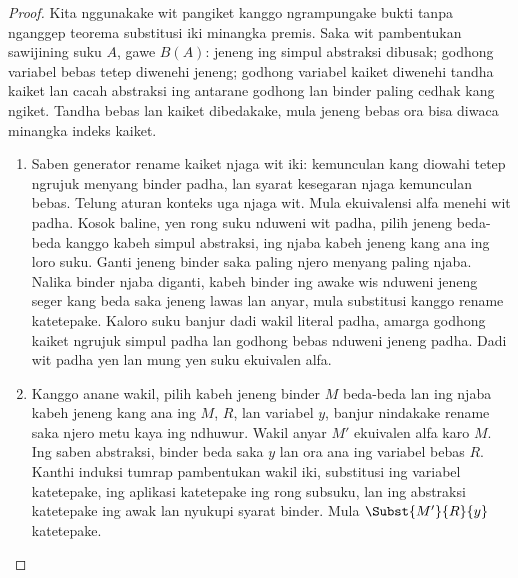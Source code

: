 \documentclass[../../../include/open-logic-section]{subfiles}
\begin{document}
\begin{proof}
  Kita nggunakake wit pangiket kanggo ngrampungake bukti tanpa nganggep teorema substitusi iki minangka premis. Saka wit pambentukan sawijining suku $A$, gawe $B(A)$: jeneng ing simpul abstraksi dibusak; godhong variabel bebas tetep diwenehi jeneng; godhong variabel kaiket diwenehi tandha kaiket lan cacah abstraksi ing antarane godhong lan binder paling cedhak kang ngiket. Tandha bebas lan kaiket dibedakake, mula jeneng bebas ora bisa diwaca minangka indeks kaiket.
  \begin{enumerate}
  \item Saben generator rename kaiket njaga wit iki: kemunculan kang diowahi tetep ngrujuk menyang binder padha, lan syarat kesegaran njaga kemunculan bebas. Telung aturan konteks uga njaga wit. Mula ekuivalensi alfa menehi wit padha. Kosok baline, yen rong suku nduweni wit padha, pilih jeneng beda-beda kanggo kabeh simpul abstraksi, ing njaba kabeh jeneng kang ana ing loro suku. Ganti jeneng binder saka paling njero menyang paling njaba. Nalika binder njaba diganti, kabeh binder ing awake wis nduweni jeneng seger kang beda saka jeneng lawas lan anyar, mula substitusi kanggo rename katetepake. Kaloro suku banjur dadi wakil literal padha, amarga godhong kaiket ngrujuk simpul padha lan godhong bebas nduweni jeneng padha. Dadi wit padha yen lan mung yen suku ekuivalen alfa.
  \item Kanggo anane wakil, pilih kabeh jeneng binder $M$ beda-beda lan ing njaba kabeh jeneng kang ana ing $M$, $R$, lan variabel $y$, banjur nindakake rename saka njero metu kaya ing ndhuwur. Wakil anyar $M'$ ekuivalen alfa karo $M$. Ing saben abstraksi, binder beda saka $y$ lan ora ana ing variabel bebas $R$. Kanthi induksi tumrap pambentukan wakil iki, substitusi ing variabel katetepake, ing aplikasi katetepake ing rong subsuku, lan ing abstraksi katetepake ing awak lan nyukupi syarat binder. Mula $\Subst{M'}{R}{y}$ katetepake.


\end{enumerate}
\end{proof}
\end{document}
